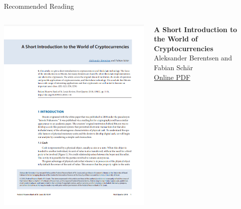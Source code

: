 \documentclass[handout]{beamer}
\begin{document}
\begin{frame}{Recommended Reading}
\begin{columns}
	\begin{column}{0.3\textwidth}
	\center
	\includegraphics[width=\textwidth , frame]{../assets/images/short-introduction-cryptocurrencies.png}
	\end{column}
	\begin{column}{0.7\textwidth}
	\textbf{A Short Introduction to the World of Cryptocurrencies} \\
	Aleksander Berentsen and Fabian Schär \\
	\link \href{https://files.stlouisfed.org/files/htdocs/publications/review/2018/01/10/a-short-introduction-to-the-world-of-cryptocurrencies.pdf}{Online PDF}
	\end{column}
\end{columns}
\end{frame}
\end{document}
